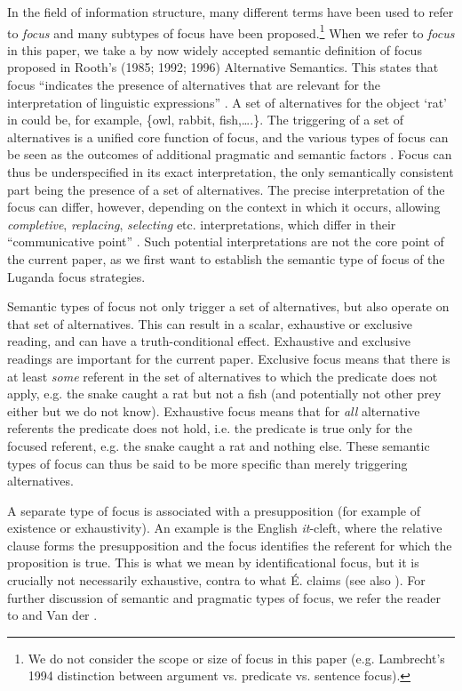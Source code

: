 \documentclass[output=paper]{langsci/langscibook}
\begin{document}
In the field of information structure, many different terms have been used to refer to \textit{focus} and many subtypes of focus have been proposed.\footnote{We do not consider the scope or size of focus in this paper (e.g. Lambrecht’s 1994 distinction between argument vs. predicate vs. sentence focus).}{} When we refer to \textit{focus} in this paper, we take a by now widely accepted semantic definition of focus proposed in Rooth’s (1985; 1992; 1996) Alternative Semantics. This states that focus “indicates the presence of alternatives that are relevant for the interpretation of linguistic expressions” \citep[6]{Krifka2007}. A set of alternatives for the object ‘rat’ in  could be, for example, \{owl, rabbit, fish,….\}. The triggering of a set of alternatives is a unified core function of focus, and the various types of focus can be seen as the outcomes of additional pragmatic and semantic factors \citep{ZimmermannOnea2011}. Focus can thus be underspecified in its exact interpretation, the only semantically consistent part being the presence of a set of alternatives. The precise interpretation of the focus can differ, however, depending on the context in which it occurs, allowing \textit{completive}, \textit{replacing}, \textit{selecting} etc. interpretations, which differ in their “communicative point” \citep[281]{Dik1997}. Such potential interpretations are not the core point of the current paper, as we first want to establish the semantic type of focus of the Luganda focus strategies. 

Semantic types of focus not only trigger a set of alternatives, but also operate on that set of alternatives. This can result in a scalar, exhaustive or exclusive reading, and can have a truth-conditional effect. Exhaustive and exclusive readings are important for the current paper. Exclusive focus means that there is at least \textit{some} referent in the set of alternatives to which the predicate does not apply, e.g. the snake caught a rat but not a fish (and potentially not other prey either but we do not know). Exhaustive focus means that for \textit{all} alternative referents the predicate does not hold, i.e. the predicate is true only for the focused referent, e.g. the snake caught a rat and nothing else. These semantic types of focus can thus be said to be more specific than merely triggering alternatives.

A separate type of focus is associated with a presupposition (for example of existence or exhaustivity). An example is the English \textit{it}-cleft, where the relative clause forms the presupposition and the focus identifies the referent for which the proposition is true. This is what we mean by identificational focus, but it is crucially not necessarily exhaustive, contra to what É. \citet{Kiss1998} claims (see also \citealt{OneaBeaver2011,ByramWashburn2013,DestruelEtAl2015}). For further discussion of semantic and pragmatic types of focus, we refer the reader to \citet{Bazalgette2015} and Van der \citet{Wal2016}.  
\end{document}
